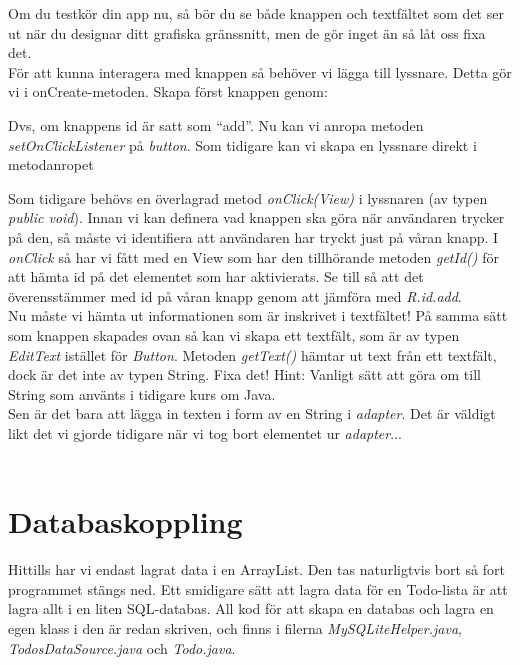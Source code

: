 \documentclass[11 pt, titlepage]{article} %
\begin{document}
Om du testkör din app nu, så bör du se både knappen och textfältet som det ser ut när du designar ditt grafiska gränssnitt, men de gör inget än så låt oss fixa det. \\

För att kunna interagera med knappen så behöver vi lägga till lyssnare. Detta gör vi i onCreate-metoden. Skapa först knappen genom: 

Dvs, om knappens id är satt som ``add''. Nu kan vi anropa metoden \textit{setOnClickListener} på \textit{button}. Som tidigare kan vi skapa en lyssnare direkt i metodanropet


Som tidigare behövs en överlagrad metod \textit{onClick(View)} i lyssnaren (av typen \textit{public void}). Innan vi kan definera vad knappen ska göra när användaren trycker på den, så måste vi identifiera att användaren har tryckt just på våran knapp.
I \textit{onClick} så har vi fått med en View som har den tillhörande metoden \textit{getId()} för att hämta id på det elementet som har aktivierats.
Se till så att det överensstämmer med id på våran knapp genom att jämföra med \textit{R.id.add}.\\

Nu måste vi hämta ut informationen som är inskrivet i textfältet! På samma sätt som knappen skapades ovan så kan vi skapa ett textfält, som är av typen \textit{EditText} istället för \textit{Button}.
Metoden \textit{getText()} hämtar ut text från ett textfält, dock är det inte av typen String. Fixa det! Hint: Vanligt sätt att göra om till String som använts i tidigare kurs om Java. \\

Sen är det bara att lägga in texten i form av en String i \textit{adapter}. Det är väldigt likt det vi gjorde tidigare när vi tog bort elementet ur \textit{adapter}...\\ \\
\section{Databaskoppling}
Hittills har vi endast lagrat data i en ArrayList.
Den tas naturligtvis bort så fort programmet stängs ned.
Ett smidigare sätt att lagra data för en Todo-lista är att lagra allt i en liten SQL-databas.
All kod för att skapa en databas och lagra en egen klass i den är redan skriven, och finns i filerna \textit{MySQLiteHelper.java}, \textit{TodosDataSource.java} och \textit{Todo.java}.\\
\end{document}
